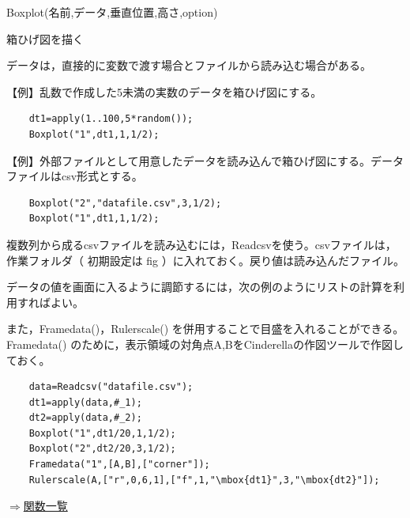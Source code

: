 \documentclass[papersize,a4paper,12pt,uplatex]{jsarticle}
\begin{document}
\vspace{\baselineskip}
\begin{description}
\hypertarget{boxplot}{}
\item[関数]  Boxplot(名前,データ,垂直位置,高さ,option)
\item[機能]  箱ひげ図を描く
\item[説明]  データは，直接的に変数で渡す場合とファイルから読み込む場合がある。

\vspace{\baselineskip}
【例】乱数で作成した5未満の実数のデータを箱ひげ図にする。

\begin{verbatim}
    dt1=apply(1..100,5*random());
    Boxplot("1",dt1,1,1/2);
\end{verbatim}

\hspace{20mm} 

\vspace{\baselineskip}
【例】外部ファイルとして用意したデータを読み込んで箱ひげ図にする。データファイルはcsv形式とする。
\begin{verbatim}
    Boxplot("2","datafile.csv",3,1/2);
    Boxplot("1",dt1,1,1/2);
\end{verbatim}
\vspace{\baselineskip}
複数列から成るcsvファイルを読み込むには，Readcsvを使う。csvファイルは，作業フォルダ（ 初期設定は fig ）に入れておく。戻り値は読み込んだファイル。
  
データの値を画面に入るように調節するには，次の例のようにリストの計算を利用すればよい。
 
また，Framedata()，Rulerscale() を併用することで目盛を入れることができる。Framedata() のために，表示領域の対角点A,BをCinderellaの作図ツールで作図しておく。

\begin{verbatim}
    data=Readcsv("datafile.csv");
    dt1=apply(data,#_1);
    dt2=apply(data,#_2);
    Boxplot("1",dt1/20,1,1/2);
    Boxplot("2",dt2/20,3,1/2);
    Framedata("1",[A,B],["corner"]);
    Rulerscale(A,["r",0,6,1],["f",1,"\mbox{dt1}",3,"\mbox{dt2}"]);
\end{verbatim}
\vspace{\baselineskip}
 \begin{center}  \end{center}

\begin{flushright}  \hyperlink{functionlist}{$\Rightarrow$関数一覧}\end{flushright}


\end{description}
\end{document}

